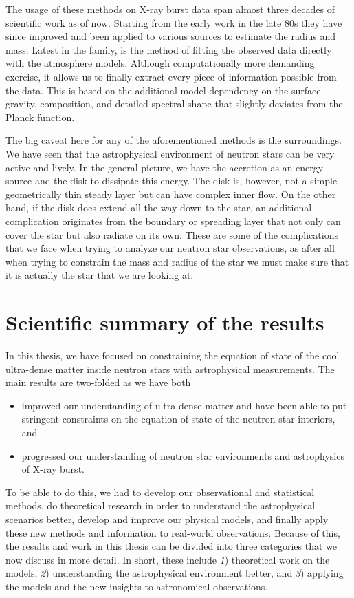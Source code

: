 The usage of these methods on X-ray burst data span almost three decades of scientific work as of now.
Starting from the early work in the late 80s they have since improved and been applied to various sources to estimate the radius and mass.
Latest in the family, is the method of fitting the observed data directly with the atmosphere models.\cite{NMS17}
Although computationally more demanding exercise, it allows us to finally extract every piece of information possible from the data.
This is based on the additional model dependency on the surface gravity, composition, and detailed spectral shape that slightly deviates from the Planck function.


The big caveat here for any of the aforementioned methods is the surroundings.
We have seen that the astrophysical environment of neutron stars can be very active and lively.
In the general picture, we have the accretion as an energy source and the disk to dissipate this energy.
The disk is, however, not a simple geometrically thin steady layer but can have complex inner flow.
On the other hand, if the disk does extend all the way down to the star, an additional complication originates from the boundary or spreading layer that not only can cover the star but also radiate on its own.
These are some of the complications that we face when trying to analyze our neutron star observations, as after all when trying to constrain the mass and radius of the star we must make sure that it is actually the star that we are looking at.


\section{Scientific summary of the results}

In this thesis, we have focused on constraining the equation of state of the cool ultra-dense matter inside neutron stars with astrophysical measurements.
The main results are two-folded as we have both
\begin{itemize}
\item improved our understanding of ultra-dense matter and have been able to put stringent constraints on the equation of state of the neutron star interiors, and
\item progressed our understanding of neutron star environments and astrophysics of X-ray burst.
\end{itemize}
To be able to do this, we had to develop our observational and statistical methods, do theoretical research in order to understand the astrophysical scenarios better, develop and improve our physical models, and finally apply these new methods and information to real-world observations.
Because of this, the results and work in this thesis can be divided into three categories that we now discuss in more detail. 
In short, these include \textit{1}) theoretical work on the models, \textit{2}) understanding the astrophysical environment better, and \textit{3}) applying the models and the new insights to astronomical observations.


